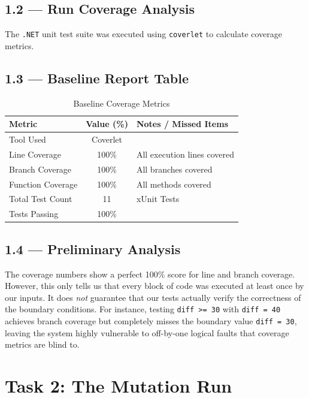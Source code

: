 \documentclass[11pt,a4paper]{article}
\begin{document}
\subsection{1.2 — Run Coverage Analysis}
The \texttt{.NET} unit test suite was executed using \texttt{coverlet} to calculate coverage metrics.

\subsection{1.3 — Baseline Report Table}
\begin{table}[h!]
    \centering
    \renewcommand{\arraystretch}{1.3}
    \begin{tabularx}{0.8\textwidth}{l c X}
        \toprule
        \textbf{Metric} & \textbf{Value (\%)} & \textbf{Notes / Missed Items} \\
        \midrule
        Tool Used & Coverlet & \\
        Line Coverage & 100\% & All execution lines covered \\
        Branch Coverage & 100\% & All branches covered \\
        Function Coverage & 100\% & All methods covered \\
        Total Test Count & 11 & xUnit Tests \\
        Tests Passing & 100\% & \\
        \bottomrule
    \end{tabularx}
    \caption{Baseline Coverage Metrics}
\end{table}

\subsection{1.4 — Preliminary Analysis}
The coverage numbers show a perfect 100\% score for line and branch coverage. However, this only tells us that every block of code was executed at least once by our inputs. It does \textit{not} guarantee that our tests actually verify the correctness of the boundary conditions. For instance, testing \texttt{diff >= 30} with \texttt{diff = 40} achieves branch coverage but completely misses the boundary value \texttt{diff = 30}, leaving the system highly vulnerable to off-by-one logical faults that coverage metrics are blind to.

\section{Task 2: The Mutation Run}
\end{document}
